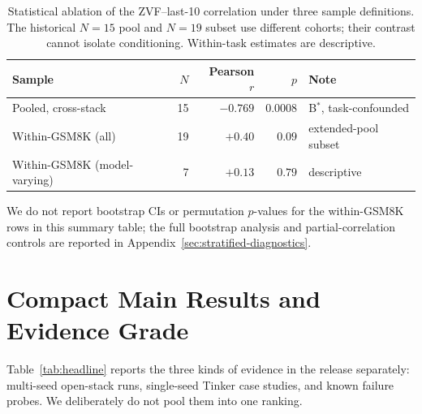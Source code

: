 \documentclass{article}
\begin{document}
\begin{table}[htbp]
\centering\small
\setlength{\tabcolsep}{5pt}
\caption{Statistical ablation of the ZVF--last-10 correlation under three
sample definitions. The historical $N=15$ pool and $N=19$ subset use different cohorts;
their contrast cannot isolate conditioning. Within-task estimates are descriptive.}
\label{tab:zvf-stat-ablation}
\begin{tabular}{@{}l r r r l@{}}
\toprule
\textbf{Sample} & \textbf{$N$} & \textbf{Pearson $r$} & \textbf{$p$} & \textbf{Note} \\
\midrule
Pooled, cross-stack          & 15 & $-0.769$ & $0.0008$ & B$^{*}$, task-confounded \\
Within-GSM8K (all)           & 19 & $+0.40$  & $0.09$   & extended-pool subset \\
Within-GSM8K (model-varying) &  7 & $+0.13$  & $0.79$   & descriptive \\
\bottomrule
\end{tabular}
\end{table}

\noindent
We do not report bootstrap CIs or permutation $p$-values for the
within-GSM8K rows in this summary table; the full bootstrap analysis and
partial-correlation controls are reported in Appendix~\ref{sec:stratified-diagnostics}.

\section{Compact Main Results and Evidence Grade}
\label{sec:main_results}
\label{sec:results}

Table~\ref{tab:headline} reports the three kinds of evidence in the release
separately: multi-seed open-stack runs, single-seed Tinker case studies, and
known failure probes. We deliberately do not pool them into one ranking.
\end{document}
